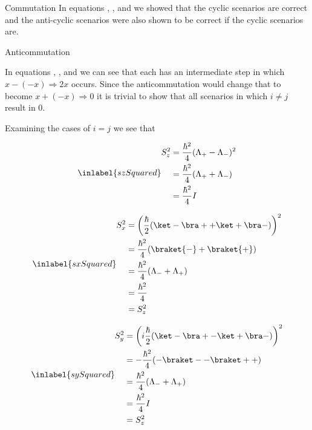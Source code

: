 \begin{answer}
\begin{answerpart}{Commutation}
    In equations , , and  we
    showed that the cyclic scenarios are correct and the anti-cyclic
    scenarios were also shown to be correct if the cyclic scenarios
    are.
    
  \end{answerpart}



  \begin{answerpart}{Anticommutation}

    In equations , , and  we can
    see that each has an intermediate step in which $x - (-x)
    \Rightarrow 2x$ occurs.  Since the anticommutation would change
    that to become $x + (-x) \Rightarrow 0$ it is trivial to show that
    all scenarios in which $i \ne j$ result in 0.

    Examining the cases of $i=j$ we see that

    \begin{equation}
      \inlabel{szSquared}
      \begin{split}
        S_z^2 &= \frac{\hbar^2}{4} (\Lambda_+ - \Lambda_-)^2\\
        &= \frac{\hbar^2}{4} (\Lambda_+ + \Lambda_-)\\
        &= \frac{\hbar^2}{4} I\\
      \end{split}
    \end{equation}

    \begin{equation}
      \inlabel{sxSquared}
      \begin{split}
        S_x^2 &= \left( \frac \hbar 2 (\ket - \bra + + \ket + \bra -) \right)^2\\
        &= \frac{\hbar^2}{4}(\braket{-} + \braket{+})\\
        &= \frac{\hbar^2}{4}(\Lambda_- + \Lambda_+)\\
        &= \frac{\hbar^2}{4}\\
        &= S_z^2\\
      \end{split}
    \end{equation}

    \begin{equation}
      \inlabel{sySquared}
      \begin{split}
        S_y^2 &= \left( i \frac \hbar 2 (\ket - \bra + - \ket + \bra -) \right)^2\\
        &= - \frac{\hbar^2}{4}(-\braket - - \braket + +)\\
        &= \frac{\hbar^2}{4} (\Lambda_- + \Lambda_+) \\
        &= \frac{\hbar^2}{4} I\\
        &= S_z^2\\
      \end{split}
    \end{equation}


\end{answerpart}
\end{answer}
